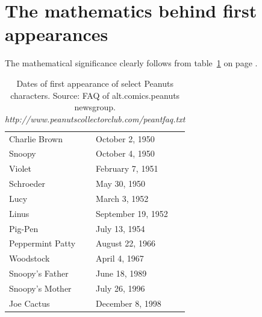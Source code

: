 \section{The mathematics behind first appearances}

The mathematical significance clearly follows from  table~\ref{T:FirstAps} on
page \pageref{T:FirstAps}.

\begin{table}
\begin{tabular}{ll}
Charlie Brown & October 2, 1950\\
Snoopy & October 4, 1950\\
Violet & February 7, 1951\\
Schroeder & May 30, 1950\\
Lucy & March 3, 1952\\
Linus & September 19, 1952\\
Pig-Pen & July 13, 1954\\
Peppermint Patty & August 22, 1966\\
Woodstock & April 4, 1967\\
Snoopy's Father & June 18, 1989\\
Snoopy's Mother & July 26, 1996\\
Joe Cactus & December 8, 1998
\end{tabular}


\caption[Dates of first appearance of characters]{Dates of first appearance of
select Peanuts characters. Source: FAQ of alt.comics.peanuts newsgroup.\\
{\em http://www.peanutscollectorclub.com/peantfaq.txt}}
\label{T:FirstAps}
\end{table}



